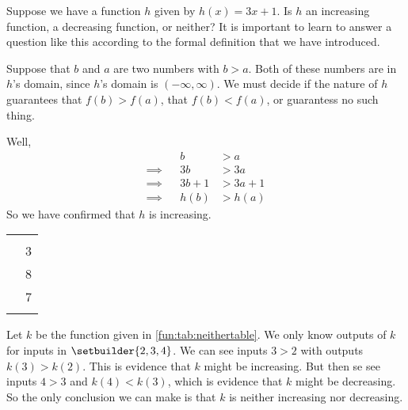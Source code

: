 \begin{pccexample}\label{fun:ex:incformula}
Suppose we have a function $h$ given by $h(x)=3x+1$. Is $h$ an increasing function, a decreasing function, or neither? It is important to learn to answer a question like this according to the formal definition that we have introduced.

\begin{pccsolution}
Suppose that $b$ and $a$ are two numbers with $b>a$. Both of these numbers are in $h$'s domain, since $h$'s domain is $(-\infty,\infty)$. We must decide if the nature of $h$ guarantees that $f(b)>f(a)$, that $f(b)<f(a)$, or guarantess no such thing.

Well,
\begin{align*}
				&&b 	&>a\\
\implies&&3b	&>3a\\
\implies&&3b+1&>3a+1\\
\implies&&h(b)&>h(a) 
\end{align*}
So we have confirmed that $h$ is increasing.
\end{pccsolution}
\end{pccexample}
%
\begin{pccexample}\label{fun:ex:neithertable}
\begin{margintable}
	\centering
	 \label{fun:tab:neithertable}
	\begin{tabular}{S[table-format=1.0]S[table-format=1.0]}
		\beforeheading
		 & \\
		   & 3    \\ 	& 8  \\   & 7 \\\lastline
	\end{tabular}
\end{margintable}
Let $k$ be the function given in \cref{fun:tab:neithertable}. We only know outputs of $k$ for inputs in $\setbuilder{2,3,4}$. We can see inputs $3>2$ with outputs $k(3)>k(2)$. This is evidence that $k$ might be increasing. But then se see inputs $4>3$ and $k(4)<k(3)$, which is evidence that $k$ might be decreasing. So the only conclusion we can make is that $k$ is neither increasing nor decreasing.
\end{pccexample}

